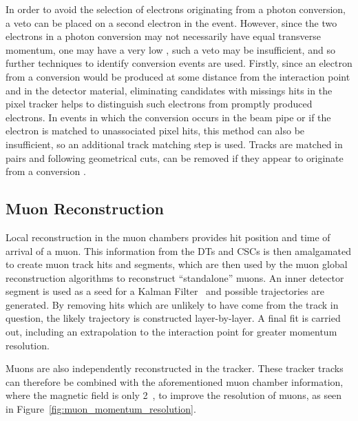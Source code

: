 In order to avoid the selection of electrons originating from a photon conversion, a veto can be placed on a
second electron in the event. However, since the two electrons in a photon conversion may not necessarily have
equal transverse momentum, \ie one may have a very low \pt, such a veto may be insufficient, and so further
techniques to identify conversion events are used. Firstly, since an electron from a conversion would be
produced at some distance from the interaction point and in the detector material, eliminating candidates with
missings hits in the pixel tracker helps to distinguish such electrons from promptly produced electrons. In
events in which the conversion occurs in the beam pipe or if the electron is matched to unassociated pixel
hits, this method can also be insufficient, so an additional track matching step is used. Tracks are matched
in pairs and following geometrical cuts, can be removed if they appear to originate from a conversion
\cite{electron_reconstruction}.

\subsection{Muon Reconstruction}
\label{ss:muon_reconstruction}
Local reconstruction in the muon chambers provides hit position and time of arrival of a muon. This
information from the DTs and CSCs is then amalgamated to create muon track hits and segments, which are then
used by the muon global reconstruction algorithms to reconstruct ``standalone'' muons. An inner detector
segment is used as a seed for a Kalman Filter~\cite{kalman_filter, Speer:927395} and possible trajectories are
generated. By removing hits which are unlikely to have come from the track in question, the likely trajectory
is constructed layer-by-layer. A final fit is carried out, including an extrapolation to the interaction point
for greater momentum resolution.

Muons are also independently reconstructed in the tracker. These tracker tracks can therefore be combined with
the aforementioned muon chamber information, where the magnetic field is only 2~\tesla, to improve the \pt
resolution of muons, as seen in Figure~\ref{fig:muon_momentum_resolution}.


